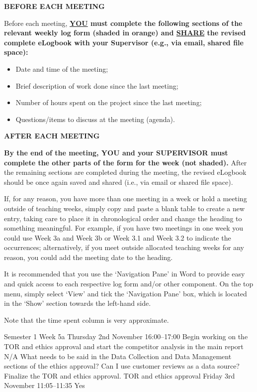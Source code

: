 \documentclass[../CHEFCookingHelperForEveryonesFridge.tex]{subfiles}
\begin{document}
\textbf{BEFORE EACH MEETING}

Before each meeting, \textbf{\ul{YOU} must complete the following sections of the relevant weekly log form
(\colorbox{\logbookshadecolour}{shaded in orange}) and \ul{SHARE} the revised complete eLogbook with your Supervisor
(e.g., via email, shared file space):}

\begin{itemize}
    \item Date and time of the meeting;
    \item Brief description of work done since the last meeting;
    \item Number of hours spent on the project since the last meeting;
    \item Questions/items to discuss at the meeting (agenda).
\end{itemize}

\textbf{AFTER EACH MEETING}

\textbf{By the end of the meeting, YOU and your SUPERVISOR must complete the other parts of the form for the week
(not shaded).} After the remaining sections are completed during the meeting, the revised eLogbook should be once
again saved and shared (i.e., via email or shared file space).

If, for any reason, you have more than one meeting in a week or hold a meeting outside of teaching weeks,
simply copy and paste a blank table to create a new entry, taking care to place it in chronological order and
change the heading to something meaningful. For example, if you have two meetings in one week you could use
Week 3a and Week 3b or Week 3.1 and Week 3.2 to indicate the occurrences; alternatively, if you meet outside
allocated teaching weeks for any reason, you could add the meeting date to the heading.

It is recommended that you use the \enquote*{Navigation Pane} in Word to provide easy and quick access to each respective
log form and/or other component.  On the top menu, simply select \enquote*{View} and tick the \enquote*{Navigation Pane} box, which
is located in the \enquote*{Show} section towards the left-hand side.

Note that the time spent column is very approximate.

\logbookentry
{Semester 1 Week 5a}
{Thursday 2nd November 16:00--17:00}
{Begin working on the TOR and ethics approval and start the competitor analysis in the main report}
{N/A}
{What needs to be said in the Data Collection and Data Management sections of the ethics approval? Can I use customer reviews as a data source?}
{Finalize the TOR and ethics approval.}
{TOR and ethics approval}
{Friday 3rd November 11:05--11:35}
{Yes}
\end{document}
